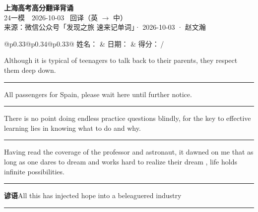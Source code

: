 \documentclass[11pt,a4paper]{article}
\newcommand{\num}[1]{\makebox[1.9em][r]{#1.}\hspace{0.3em}}
\newcommand{\wline}{\noindent\rule{\linewidth}{0.4pt}}
\begin{document}
\pagestyle{plain}
\begin{center}
{\LARGE\bfseries 上海高考高分翻译背诵 }\\[0.25em]
{\large 24一模　2026-10-03 \quad\ 回译（英 $\to$ 中）}\\[0.35em]
{\footnotesize 来源：微信公众号「发现之旅 速来记单词」· 2026-10-03 · 赵文瀚}
\end{center}

\vspace{0.4em}
\noindent\begin{tabular}{@{}p{0.33\textwidth}@{}p{0.34\textwidth}@{}p{0.33\textwidth}@{}}
姓名：\underline{\hspace{2.0cm}} & 日期：\underline{\hspace{2.0cm}} & 得分：\underline{\hspace{1.4cm}}\,/ \\
\end{tabular}

\vspace{0.5em}

\vspace{0.8em}
\num{1}Although it is typical of teenagers to talk back to their parents, they respect them deep down.

\vspace{0.25em}

\wline

\num{2}All passengers for Spain, please wait here until further notice.

\vspace{0.25em}

\wline

\num{3}There is no point doing endless practice questions blindly, for the key to effective learning lies in knowing what to do and why.

\vspace{0.25em}

\wline

\num{4}Having read the coverage of the professor and astronaut, it dawned on me that as long as one dares to dream and works hard to realize their dream , life holds infinite possibilities.

\vspace{0.25em}

\wline

\vspace{0.4em}\noindent{\color{rulegray}\rule{\textwidth}{0.6pt}}\vspace{0.4em}

\num{5}\textbf{谚语}\quad All this has injected hope into a beleaguered industry

\vspace{0.25em}

\wline
\end{document}
